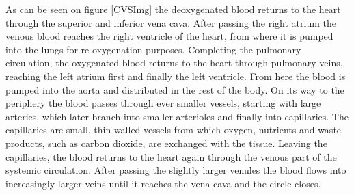 As can be seen on figure \ref{CVSImg} the deoxygenated blood returns to the heart through the superior and inferior vena cava. After passing the right atrium the venous blood reaches the right ventricle of the heart, from where it is pumped into the lungs for re-oxygenation purposes. Completing the pulmonary circulation, the oxygenated blood returns to the heart through pulmonary veins, reaching the left atrium first and finally the left ventricle. From here the blood is pumped into the aorta and distributed in the rest of the body. On its way to the periphery the blood passes through ever smaller vessels, starting with large arteries, which later branch into smaller arterioles and finally into capillaries. The capillaries are small, thin walled vessels from which oxygen, nutrients and waste products, such as carbon dioxide, are exchanged with the tissue. Leaving the capillaries, the blood returns to the heart again through the venous part of the systemic circulation. After passing the slightly larger venules the blood flows into increasingly larger veins until it reaches the vena cava and the circle closes.\\

